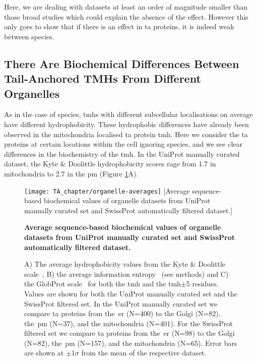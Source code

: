 Here, we are dealing with datasets at least an order of magnitude smaller than those broad studies \cite{Sharpe2010, Baker2017} which could explain the absence of the effect.
However this only goes to show that if there is an effect in \gls{ta} proteins, it is indeed weak between species.


\subsection{There Are Biochemical Differences Between Tail-Anchored TMHs From Different Organelles}

As in the case of species, \gls{tmh}s with different subcellular localisations on average  have different hydrophobicity.
These hydrophobic differences have already been observed in the mitochondria localised \gls{ta} protein \gls{tmh}.
Here we consider the \gls{ta} proteins at certain locations within the cell ignoring species, and we see clear differences in the biochemistry of the \gls{tmh}.
In the UniProt manually curated dataset, the Kyte \& Doolittle hydrophobicity scores rage from 1.7 in mitochondria to 2.7 in the \gls{pm} (Figure \ref{fig:average_organelle_factors_ta}A).

\begin{figure}[!ht]
\centering
\texttt{[image: TA\_chapter/organelle-averages]}
[Average sequence-based biochemical values of organelle datasets from UniProt manually curated set and SwissProt automatically filtered dataset.]
{\textbf{Average sequence-based biochemical values of organelle datasets from UniProt manually curated set and SwissProt automatically filtered dataset.}

A) The average hydrophobicity values from the Kyte \& Doolittle scale~\cite{Kyte1982}, B) the average information entropy~\cite{Shannon1948} (see methods) and C) the GlobProt scale~\cite{Linding2003} for both the \gls{tmh} and the \gls{tmh}$\pm$5 residues.
Values are shown for both the UniProt manually curated set and the SwissProt filtered set.
In the UniProt manually curated set we compare \gls{ta} proteins from the~\gls{er} (N=400) to the Golgi (N=82), the~\gls{pm} (N=37), and the mitochondria (N=401).
For the SwissProt filtered set we compare \gls{ta} proteins from the~\gls{er} (N=98) to the Golgi (N=82), the~\gls{pm} (N=157), and the mitochondria (N=65).
Error bars are shown at $\pm 1 \sigma$ from the mean of the respective dataset.
}

\label{fig:average_organelle_factors_ta}
\end{figure}




